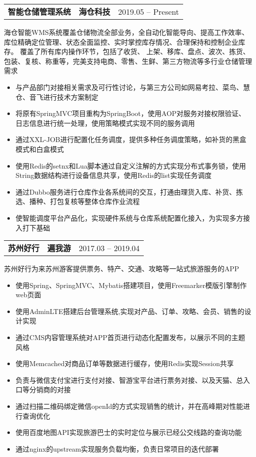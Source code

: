\documentclass{resume}
\begin{document}
	\begin{tabularx}{\textwidth}{@{}X X r@{}}
		\textbf{智能仓储管理系统} & \textbf{海仓科技} & 2019.05 -- Present \\
	\end{tabularx}
	海仓智能WMS系统覆盖仓储物流全部业务，全自动化智能导向、提高工作效率、 库位精确定位管理、状态全面监控、实时掌控库存情况、合理保持和控制企业库存。 覆盖了所有库内操作环节，包括了收货、 上架、移库、盘点、波次、拣货、包装、复核、称重等，完美支持电商、零售、生鲜、第三方物流等多行业仓储管理需求
	\begin{itemize}
	\item 与产品部门对接相关需求及可行性讨论，与第三方公司如网易考拉、菜鸟、慧仓、音飞进行技术方案制定
	\item 将原有SpringMVC项目重构为SpringBoot，使用AOP对服务对接权限验证、日志信息进行统一处理，使用策略模式实现不同的服务调用
	\item 通过XXL-JOB进行配置化任务调度，提供多种任务调度策略，如补货的黑盒模式和白盒模式
	\item 使用Redis的setnx和Lua脚本通过自定义注解的方式实现分布式事务锁，使用String数据结构进行设备信息共享，使用Redis的list实现任务调度
	\item 通过Dubbo服务进行仓库作业各系统间的交互，打通由理货入库、补货、拣选、播种、打包复核等整体仓库作业流程
	\item 使智能调度平台产品化，实现硬件系统与仓库系统配置化接入，为实现多方接入打下基础
	\end{itemize}
	
	
	\begin{tabularx}{\textwidth}{@{}X X r@{}}
		\textbf{苏州好行} & \textbf{遍我游} & 2017.03 -- 2019.04 \\
	\end{tabularx}
	苏州好行为来苏州游客提供票务、特产、交通、攻略等一站式旅游服务的APP
	\begin{itemize}
		\item 使用Spring、SpringMVC、Mybatis搭建项目，使用Freemarker模版引擎制作web页面
		\item 使用AdminLTE搭建后台管理系统,实现对产品、订单、攻略、会员、销售的设计实现
		\item 通过CMS内容管理系统对APP首页进行动态化配置发布，以展示不同的主题风格
		\item 使用Memcached对商品订单等数据进行缓存，使用Redis实现Session共享
		\item 负责与微信支付宝进行支付对接、智游宝平台进行票务对接、以及天猫、总入口等分销商的对接
		\item 通过扫描二维码绑定微信openId的方式实现销售的统计，并在高峰期对性能进行查询优化
		\item 使用百度地图API实现旅游巴士的实时定位与展示已经公交线路的查询功能
		\item 通过nginx的upstream实现服务负载均衡，负责日常项目的迭代部署
	\end{itemize}
	
\end{document}
